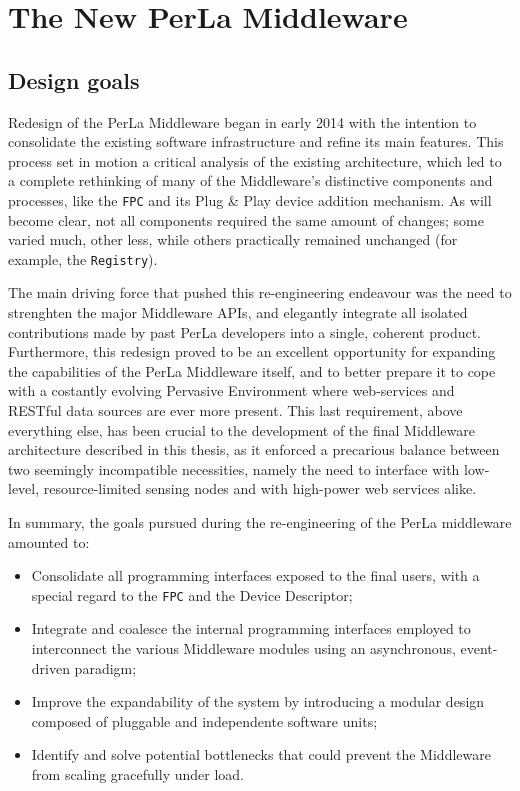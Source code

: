 \chapter{The New PerLa Middleware}
\label{cha:middleware_overview}

\section{Design goals}

Redesign of the PerLa Middleware began in early 2014 with the intention to
consolidate the existing software infrastructure and refine its main features.
This process set in motion a critical analysis of the existing architecture,
which led to a complete rethinking of many of the Middleware's distinctive
components and processes, like the \texttt{FPC} and its Plug \& Play device
addition mechanism. As will become clear, not all components required the same
amount of changes; some varied much, other less, while others practically
remained unchanged (for example, the \texttt{Registry}).

The main driving force that pushed this re-engineering endeavour was the need
to strenghten the major Middleware APIs, and elegantly integrate all isolated
contributions made by past PerLa developers into a single, coherent product.
Furthermore, this redesign proved to be an excellent opportunity for expanding
the capabilities of the PerLa Middleware itself, and to better prepare it to
cope with a costantly evolving Pervasive Environment where web-services and
RESTful data sources are ever more present. This last requirement, above
everything else, has been crucial to the development of the final Middleware
architecture described in this thesis, as it enforced a precarious balance
between two seemingly incompatible necessities, namely the need to interface
with low-level, resource-limited sensing nodes and with high-power web services
alike. 

In summary, the goals pursued during the re-engineering of the PerLa middleware
amounted to:

\begin{itemize}
    
    \item Consolidate all programming interfaces exposed to the final users,
        with a special regard to the \texttt{FPC} and the Device Descriptor;

    \item Integrate and coalesce the internal programming interfaces employed
        to interconnect the various Middleware modules using an asynchronous,
        event-driven paradigm;

    \item Improve the expandability of the system by introducing a modular
        design composed of pluggable and independente software units;

    \item Identify and solve potential bottlenecks that could prevent the
        Middleware from scaling gracefully under load.

\end{itemize}

